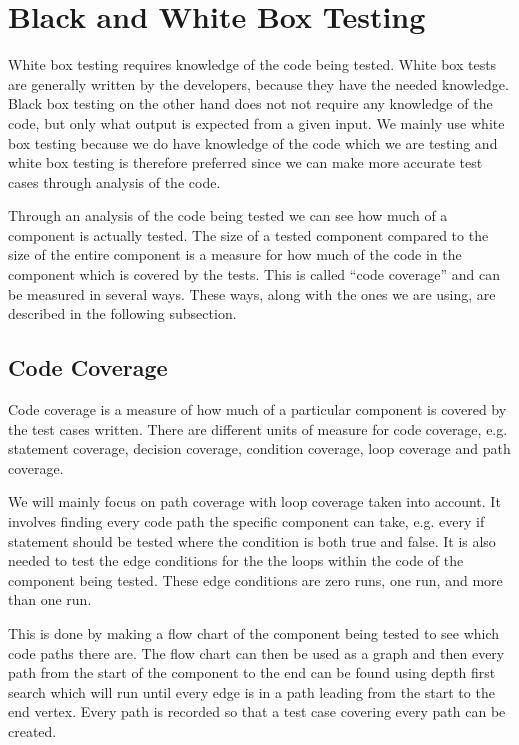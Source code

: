 \section{Black and White Box Testing}
\label{chap:whiteBox}
White box testing requires knowledge of the code being tested.
White box tests are generally written by the developers, because they have the needed knowledge.
Black box testing on the other hand does not not require any knowledge of the code, but only what output is expected from a given input.
We mainly use white box testing because we do have knowledge of the code which we are testing and white box testing is therefore preferred since we can make more accurate test cases through analysis of the code.

Through an analysis of the code being tested we can see how much of a component is actually tested.
The size of a tested component compared to the size of the entire component is a measure for how much of the code in the component which is covered by the tests.
This is called ``code coverage'' and can be measured in several ways.
These ways, along with the ones we are using, are described in the following subsection.

\subsection{Code Coverage}
\label{sub:codeCoverage}
Code coverage is a measure of how much of a particular component is covered by the test cases written. \cite{cornett10}
There are different units of measure for code coverage, e.g. statement coverage, decision coverage, condition coverage, loop coverage and path coverage.

We will mainly focus on path coverage with loop coverage taken into account.
It involves finding every code path the specific component can take, e.g. every if statement should be tested where the condition is both true and false.
It is also needed to test the edge conditions for the the loops within the code of the component being tested.
These edge conditions are zero runs, one run, and more than one run.

This is done by making a flow chart of the component being tested to see which code paths there are.
The flow chart can then be used as a graph and then every path from the start of the component to the end can be found using depth first search which will run until every edge is in a path leading from the start to the end vertex.
Every path is recorded so that a test case covering every path can be created. \cite{whiteBox}




\begin{comment}
\subsection{Our Use of White Box Testing}
We have used white box testing to test our tool component and the parts of the model component which we have wrote our selves -- the ADO.NET was used to generate much of the needed model.
In order to insure that the code of the parts we were testing was covered we created a flow chart of the most complicated parts.
\end{comment}